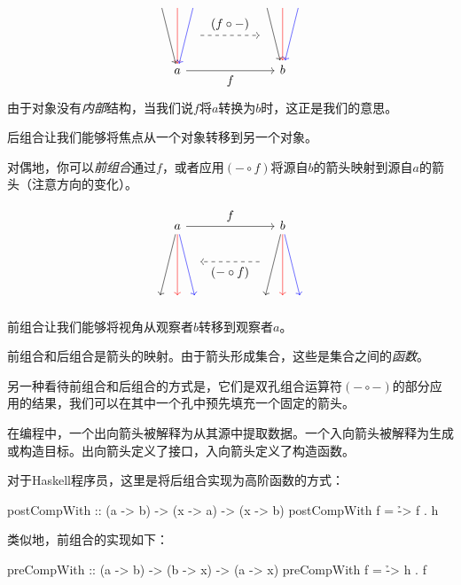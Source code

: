 \documentclass[DaoFP]{subfiles}
\begin{document}
\[
 \begin{tikzcd}
 \node (a1) at (0, 2) {};
 \node (a2) at (-0.5, 2) {};
 \node (a3) at (0.5, 2) {};
 \node (aa) at (0.5, 1) {};
 \node(a) at (0, 0) {a};
 \draw[->, red] (a1) -- (a);
 \draw[->] (a2) -- (a);
 \draw[->, blue] (a3) -- (a);
 \node (b1) at (3+0, 2) {};
 \node (b2) at (3-0.5, 2) {};
 \node (b3) at (3+0.5, 2) {};
 \node (bb) at (2.5, 1) {};
 \node(b) at (3, 0) {b};
 \draw[->, red] (b1) -- (b);
 \draw[->] (b2) -- (b);
 \draw[->, blue] (b3) -- (b);
 \draw[->] (a) -- node[below]{f} (b);
 \draw[->, dashed] (aa) -- node[above]{(f \circ -)} (bb);
  \end{tikzcd}
\]
由于对象没有\emph{内部}结构，当我们说$f$将$a$转换为$b$时，这正是我们的意思。

后组合让我们能够将焦点从一个对象转移到另一个对象。

对偶地，你可以\emph{前组合}通过$f$，或者应用$(- \circ f)$将源自$b$的箭头映射到源自$a$的箭头（注意方向的变化）。

\[
 \begin{tikzcd}
 \node (a1) at (0, -2) {};
 \node (a2) at (-0.5, -2) {};
 \node (a3) at (0.5, -2) {};
 \node (aa) at (0.5, -1) {};
 \node(a) at (0, 0) {a};
 \draw[<-, red] (a1) -- (a);
 \draw[<-] (a2) -- (a);
 \draw[<-, blue] (a3) -- (a);
 \node (b1) at (3+0, -2) {};
 \node (b2) at (3-0.5, -2) {};
 \node (b3) at (3+0.5, -2) {};
 \node (bb) at (2.5, -1) {};
 \node(b) at (3, 0) {b};
 \draw[<-, red] (b1) -- (b);
 \draw[<-] (b2) -- (b);
 \draw[<-, blue] (b3) -- (b);
 \draw[->] (a) -- node[above]{f} (b);
 \draw[->, dashed] (bb) -- node[below]{(- \circ f)} (aa);
  \end{tikzcd}
\]

前组合让我们能够将视角从观察者$b$转移到观察者$a$。

前组合和后组合是箭头的映射。由于箭头形成集合，这些是集合之间的\emph{函数}。

另一种看待前组合和后组合的方式是，它们是双孔组合运算符$(- \circ -)$的部分应用的结果，我们可以在其中一个孔中预先填充一个固定的箭头。

在编程中，一个出向箭头被解释为从其源中提取数据。一个入向箭头被解释为生成或构造目标。出向箭头定义了接口，入向箭头定义了构造函数。

对于Haskell程序员，这里是将后组合实现为高阶函数的方式：
\begin{haskell}
postCompWith :: (a -> b) -> (x -> a) -> (x -> b)
postCompWith f = \h -> f . h
\end{haskell}
类似地，前组合的实现如下：
\begin{haskell}
preCompWith :: (a -> b) -> (b -> x) -> (a -> x)
preCompWith f = \h -> h . f
\end{haskell}
\end{document}
